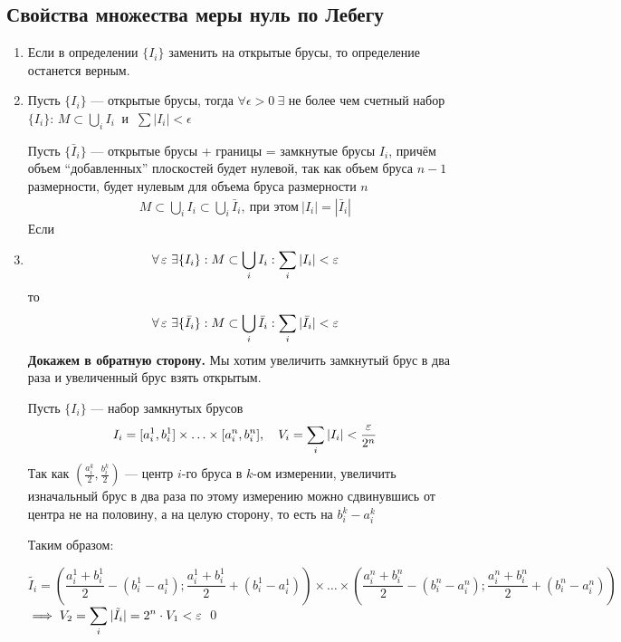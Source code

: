 \subsection{Свойства множества меры нуль по Лебегу}
\begin{enumerate}
    \item Если в определении $\{I_i\}$ заменить на открытые брусы, то определение останется верным.
    \item
    \proof Пусть $\{I_i\}$ — открытые брусы, тогда $\forall \epsilon > 0 \ \exists$ не более чем счетный набор $\{I_i\}$:
    $M\subset \displaystyle\bigcup_iI_i \ $ и $ \ \sum |I_i| < \epsilon$
    
    Пусть $\{\bar I_i\}$ — открытые брусы + границы = замкнутые брусы $I_i$, причём объем ``добавленных'' плоскостей будет нулевой, так как объем бруса $n-1$ размерности, будет нулевым для объема бруса размерности $n$
    \begin{equation*}
        \begin{aligned}
            M\subset\bigcup_iI_i \subset\bigcup_i\bar I_i, \ \text{при этом} \ |I_i| = |\bar I_i|
        \end{aligned}
    \end{equation*}
    Если
    \item

    \begin{equation*}
        \forall\ve\, \exists\{I_i\}: M \subset \bigcup_iI_i: \sum_i|I_i|<\ve
    \end{equation*}
    то
    \begin{equation*}
        \forall\ve\, \exists\{\bar I_i\}: M \subset \bigcup_i\bar I_i: \sum_i|\bar I_i|<\ve
    \end{equation*}
    \textbf{Докажем в обратную сторону.} Мы хотим увеличить замкнутый брус в два раза и увеличенный брус взять открытым.
    
    Пусть $\{I_i\}$ — набор замкнутых брусов
    \begin{equation*}
        I_i = [a^1_i, b^1_i]\times\ldots\times[a^n_i, b^n_i], \quad V_i = \sum_i|I_i|<\frac{\ve}{2^n}
    \end{equation*}
    Так как $\left(\frac{a_i^k}{2}, \frac{b_i^k}{2}\right)$ --- центр $i$-го бруса в $k$-ом измерении, увеличить изначальный брус в два раза по этому измерению можно сдвинувшись от центра не на половину, а на целую сторону, то есть на $b_i^k - a_i^k$

    Таким образом: 

    \begin{equation*}
        \tilde{I_i} = \left(\frac{a_i^1+b_i^1}{2} - (b_i^1-a_i^1) ; \frac{a_i^1 + b_i^1}{2} + (b_i^1 - a_i^1)\right) \times \ldots\times \left(\frac{a_i^n+b_i^n}{2} - (b_i^n-a_i^n) ; \frac{a_i^n + b_i^n}{2} + (b_i^n - a_i^n)\right)
    \end{equation*}
    $\implies V_2 = \displaystyle\sum_i|\tilde{I_i} | = 2^n \cdot V_1 < \ve$
    \qed


 \end{enumerate}



